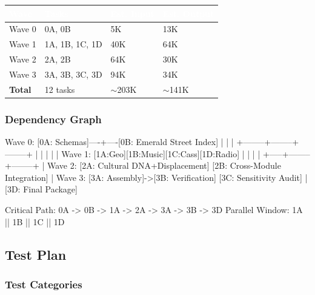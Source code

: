 \documentclass[11pt,letterpaper]{article}
\newcommand{\tableheader}[1]{\textbf{\sffamily\textcolor{white}{#1}}}
\begin{document}
\begin{center}
\begin{tabularx}{\textwidth}{L{3cm}C{2cm}C{2cm}C{2cm}}
\toprule
{}
\tableheader{Wave} & \tableheader{Tasks} & \tableheader{Est. Input} & \tableheader{Est. Output} \\
\midrule
Wave 0 & 0A, 0B & 5K & 13K \\
Wave 1 & 1A, 1B, 1C, 1D & 40K & 64K \\
Wave 2 & 2A, 2B & 64K & 30K \\
Wave 3 & 3A, 3B, 3C, 3D & 94K & 34K \\
\midrule
\textbf{Total} & 12 tasks & $\sim$203K & $\sim$141K \\
\bottomrule
\end{tabularx}
\end{center}

\subsubsection{Dependency Graph}

\begin{asciibox}
Wave 0: [0A: Schemas]----+----[0B: Emerald Street Index]
                         |              |
                         |     +--------+--------+--------+
                         |     |        |        |        |
Wave 1:               [1A:Geo][1B:Music][1C:Cass][1D:Radio]
                         |     |        |        |
                         +-----+--------+--------+
                                        |
Wave 2:                 [2A: Cultural DNA+Displacement]
                        [2B: Cross-Module Integration]
                                        |
Wave 3:              [3A: Assembly]->[3B: Verification]
                     [3C: Sensitivity Audit]
                                        |
                              [3D: Final Package]

Critical Path: 0A -> 0B -> 1A -> 2A -> 3A -> 3B -> 3D
Parallel Window: 1A || 1B || 1C || 1D
\end{asciibox}

\subsection{Test Plan}

\subsubsection{Test Categories}
\end{document}
